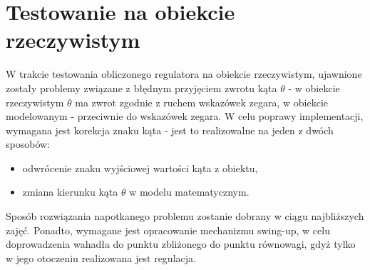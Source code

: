 \documentclass[12pt]{article}
\numberwithin{equation}{section}
\begin{document}
\section{Testowanie na obiekcie rzeczywistym}

W trakcie testowania obliczonego regulatora na obiekcie rzeczywistym, ujawnione zostały problemy związane z błędnym przyjęciem zwrotu kąta $\theta$ - w obiekcie rzeczywistym $\theta$ ma zwrot zgodnie z ruchem wskazówek zegara, w obiekcie modelowanym - przeciwnie do wskazówek zegara. W celu poprawy implementacji, wymagana jest korekcja znaku kąta - jest to realizowalne na jeden z dwóch sposobów:

\begin{itemize}
    \item odwrócenie znaku wyjściowej wartości kąta z obiektu,
    \item zmiana kierunku kąta $\theta$ w modelu matematycznym.
\end{itemize}

Sposób rozwiązania napotkanego problemu zostanie dobrany w ciągu najbliższych zajęć. Ponadto, wymagane jest opracowanie mechanizmu swing-up, w celu doprowadzenia wahadła do punktu zbliżonego do punktu równowagi, gdyż tylko w jego otoczeniu realizowana jest regulacja.


\end{document}
